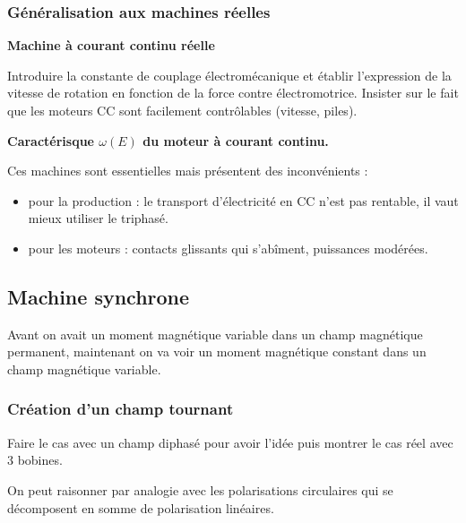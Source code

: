 \subsubsection{Généralisation aux machines réelles}

\begin{slide}
\textbf{Machine à courant continu réelle}
\end{slide}

Introduire la constante de couplage électromécanique et établir l'expression de la vitesse de rotation en fonction de la force contre électromotrice.
Insister sur le fait que les moteurs CC sont facilement contrôlables (vitesse, piles).

\begin{experience}
\textbf{Caractérisque $\omega(E)$ du moteur à courant continu.}
\end{experience}

\begin{transition}
Ces machines sont essentielles mais présentent des inconvénients :
\begin{itemize}
\item pour la production : le transport d'électricité en CC n'est pas rentable, il vaut mieux utiliser le triphasé.
\item pour les moteurs : contacts glissants qui s'abîment, puissances modérées. 
\end{itemize}
\end{transition}

\subsection{Machine synchrone}

Avant on avait un moment magnétique variable dans un champ magnétique permanent, maintenant on va voir un moment magnétique constant dans un champ magnétique variable.

\subsubsection{Création d'un champ tournant}
\label{sec:lp09_rotating_field}

Faire le cas avec un champ diphasé pour avoir l'idée puis montrer le cas réel avec 3 bobines.

\begin{remarque}
On peut raisonner par analogie avec les polarisations circulaires qui se décomposent en somme de polarisation linéaires.
\end{remarque}

